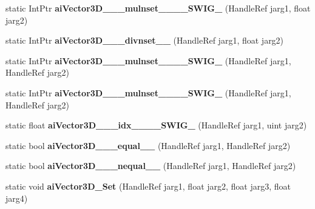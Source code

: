 \begin{DoxyCompactItemize}
\item 
\hypertarget{class_assimp_p_i_n_v_o_k_e_a853648a529394bfd547e0064517e0d0c}{static Int\+Ptr {\bfseries ai\+Vector3\+D\+\_\+\+\_\+\+\_\+mulnset\+\_\+\+\_\+\+\_\+\+\_\+\+S\+W\+I\+G\+\_} (Handle\+Ref jarg1, float jarg2)}\label{class_assimp_p_i_n_v_o_k_e_a853648a529394bfd547e0064517e0d0c}

\item 
\hypertarget{class_assimp_p_i_n_v_o_k_e_a9a178b4a04fa02e6aef14c8e601a48c5}{static Int\+Ptr {\bfseries ai\+Vector3\+D\+\_\+\+\_\+\+\_\+divnset\+\_\+\+\_\+} (Handle\+Ref jarg1, float jarg2)}\label{class_assimp_p_i_n_v_o_k_e_a9a178b4a04fa02e6aef14c8e601a48c5}

\item 
\hypertarget{class_assimp_p_i_n_v_o_k_e_afa6fca6b3daa9974770f534c08ae0279}{static Int\+Ptr {\bfseries ai\+Vector3\+D\+\_\+\+\_\+\+\_\+mulnset\+\_\+\+\_\+\+\_\+\+\_\+\+S\+W\+I\+G\+\_} (Handle\+Ref jarg1, Handle\+Ref jarg2)}\label{class_assimp_p_i_n_v_o_k_e_afa6fca6b3daa9974770f534c08ae0279}

\item 
\hypertarget{class_assimp_p_i_n_v_o_k_e_a73dc6a6bef472a4a70823b9186144578}{static Int\+Ptr {\bfseries ai\+Vector3\+D\+\_\+\+\_\+\+\_\+mulnset\+\_\+\+\_\+\+\_\+\+\_\+\+S\+W\+I\+G\+\_} (Handle\+Ref jarg1, Handle\+Ref jarg2)}\label{class_assimp_p_i_n_v_o_k_e_a73dc6a6bef472a4a70823b9186144578}

\item 
\hypertarget{class_assimp_p_i_n_v_o_k_e_a14e3358b2ffe4386bab47fac199cd2c0}{static float {\bfseries ai\+Vector3\+D\+\_\+\+\_\+\+\_\+idx\+\_\+\+\_\+\+\_\+\+\_\+\+S\+W\+I\+G\+\_} (Handle\+Ref jarg1, uint jarg2)}\label{class_assimp_p_i_n_v_o_k_e_a14e3358b2ffe4386bab47fac199cd2c0}

\item 
\hypertarget{class_assimp_p_i_n_v_o_k_e_a94ea2b669b4583be962c575fd1eda428}{static bool {\bfseries ai\+Vector3\+D\+\_\+\+\_\+\+\_\+equal\+\_\+\+\_\+} (Handle\+Ref jarg1, Handle\+Ref jarg2)}\label{class_assimp_p_i_n_v_o_k_e_a94ea2b669b4583be962c575fd1eda428}

\item 
\hypertarget{class_assimp_p_i_n_v_o_k_e_a31af254ba754843eca4ed7ebfe8a8671}{static bool {\bfseries ai\+Vector3\+D\+\_\+\+\_\+\+\_\+nequal\+\_\+\+\_\+} (Handle\+Ref jarg1, Handle\+Ref jarg2)}\label{class_assimp_p_i_n_v_o_k_e_a31af254ba754843eca4ed7ebfe8a8671}

\item 
\hypertarget{class_assimp_p_i_n_v_o_k_e_adc5cf61665395581803d6b3c44134e58}{static void {\bfseries ai\+Vector3\+D\+\_\+\+Set} (Handle\+Ref jarg1, float jarg2, float jarg3, float jarg4)}\label{class_assimp_p_i_n_v_o_k_e_adc5cf61665395581803d6b3c44134e58}


\end{DoxyCompactItemize}
